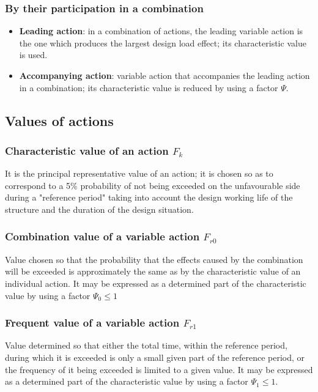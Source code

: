 \subsubsection{By their participation in a combination} \label{sc_modo_partic_acc}
\begin{itemize}
\item \textbf{Leading action}: in a combination of actions, the leading variable action is the one which produces the largest design load effect; its characteristic value is used.
\item \textbf{Accompanying action}: variable action that accompanies the leading action in a combination; its characteristic value is reduced by using a factor $\Psi$.
\end{itemize}

\subsection{Values of actions} \label{sc_val_acciones}

\subsubsection{Characteristic value of an action $F_k$} \label{sc_val_carac}
It is the principal representative value of an action; it is chosen so as to correspond to a 5\% probability of not being exceeded on the unfavourable side during a "reference period" taking into account the design working life of the structure and the duration of the design situation.

\subsubsection{Combination value of a variable action $F_{r0}$}
Value chosen so that the probability that the effects caused by the combination will be exceeded is approximately the same as by the characteristic value of an individual action. It may be expressed as a determined part of the characteristic value by using a factor $\Psi_0 \le 1$

\subsubsection{Frequent value of a variable action $F_{r1}$}
Value determined so that either the total time, within the reference period, during which it is exceeded is only a small given part
of the reference period, or the frequency of it being exceeded is limited to a given value. It may be expressed as a determined part of the characteristic value by using a factor $\Psi_1 \le 1$.

